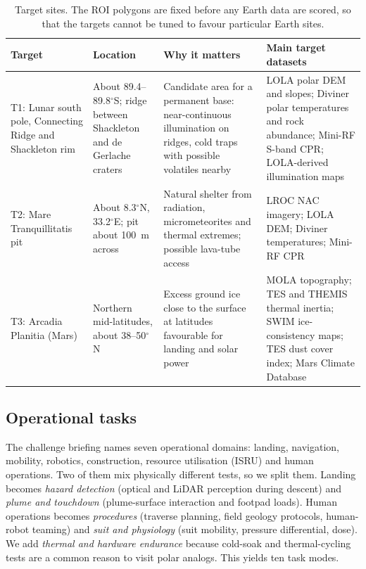 \documentclass[11pt,a4paper]{article}
\begin{document}
\begin{table}[htbp]
\centering
\caption{Target sites. The ROI polygons are fixed before any Earth data are scored, so that the targets cannot be tuned to favour particular Earth sites.}
\label{tab:targets}
\small
\begin{tabular}{p{2.6cm}p{3.4cm}p{4.6cm}p{4.2cm}}
\toprule
Target & Location & Why it matters & Main target datasets \\
\midrule
T1: Lunar south pole, Connecting Ridge and Shackleton rim & About 89.4--89.8$^\circ$S; ridge between Shackleton and de Gerlache craters & Candidate area for a permanent base: near-continuous illumination on ridges, cold traps with possible volatiles nearby \citep{mazarico2011,speyerer2013,glaser2014} & LOLA polar DEM and slopes; Diviner polar temperatures and rock abundance; Mini-RF S-band CPR; LOLA-derived illumination maps \\
T2: Mare Tranquillitatis pit & About 8.3$^\circ$N, 33.2$^\circ$E; pit about 100~m across \citep{wagner2014} & Natural shelter from radiation, micrometeorites and thermal extremes; possible lava-tube access \citep{haruyama2009,wagner2014} & LROC NAC imagery; LOLA DEM; Diviner temperatures; Mini-RF CPR \\
T3: Arcadia Planitia (Mars) & Northern mid-latitudes, about 38--50$^\circ$N & Excess ground ice close to the surface at latitudes favourable for landing and solar power \citep{bramson2015,morgan2021} & MOLA topography; TES and THEMIS thermal inertia; SWIM ice-consistency maps; TES dust cover index; Mars Climate Database \\
\bottomrule
\end{tabular}
\end{table}

\subsection{Operational tasks}
The challenge briefing names seven operational domains: landing, navigation, mobility, robotics, construction, resource utilisation (ISRU) and human operations. Two of them mix physically different tests, so we split them. Landing becomes \emph{hazard detection} (optical and LiDAR perception during descent) and \emph{plume and touchdown} (plume-surface interaction and footpad loads). Human operations becomes \emph{procedures} (traverse planning, field geology protocols, human-robot teaming) and \emph{suit and physiology} (suit mobility, pressure differential, dose). We add \emph{thermal and hardware endurance} because cold-soak and thermal-cycling tests are a common reason to visit polar analogs. This yields ten task modes.
\end{document}
